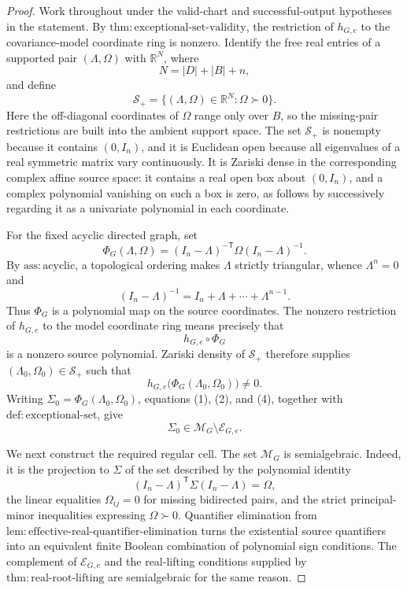 \documentclass{article}
\begin{document}
\begin{proof}
Work throughout under the valid-chart and successful-output hypotheses in the statement.  By \(\mathrm{thm:exceptional\mbox{-}set\mbox{-}validity}\), the restriction of \(h_{G,e}\) to the covariance-model coordinate ring is nonzero.  Identify the free real entries of a supported pair \((\Lambda,\Omega)\) with \(\mathbb R^N\), where
\[
 N=|D|+|B|+n,
\]
and define
\[
 \mathcal S_+
 =\{(\Lambda,\Omega)\in\mathbb R^N:\Omega\succ0\}.
\tag{1}
\]
Here the off-diagonal coordinates of \(\Omega\) range only over \(B\), so the missing-pair restrictions are built into the ambient support space.  The set \(\mathcal S_+\) is nonempty because it contains \((0,I_n)\), and it is Euclidean open because all eigenvalues of a real symmetric matrix vary continuously.  It is Zariski dense in the corresponding complex affine source space: it contains a real open box about \((0,I_n)\), and a complex polynomial vanishing on such a box is zero, as follows by successively regarding it as a univariate polynomial in each coordinate.

For the fixed acyclic directed graph, set
\[
 \Phi_G(\Lambda,\Omega)
 =(I_n-\Lambda)^{-\mathsf T}\Omega(I_n-\Lambda)^{-1}.
\tag{2}
\]
By \(\mathrm{ass:acyclic}\), a topological ordering makes \(\Lambda\) strictly triangular, whence \(\Lambda^n=0\) and
\[
 (I_n-\Lambda)^{-1}=I_n+\Lambda+\cdots+\Lambda^{n-1}.
\tag{3}
\]
Thus \(\Phi_G\) is a polynomial map on the source coordinates.  The nonzero restriction of \(h_{G,e}\) to the model coordinate ring means precisely that
\[
 h_{G,e}\circ\Phi_G
\]
is a nonzero source polynomial.  Zariski density of \(\mathcal S_+\) therefore supplies \((\Lambda_0,\Omega_0)\in\mathcal S_+\) such that
\[
 h_{G,e}\bigl(\Phi_G(\Lambda_0,\Omega_0)\bigr)\ne0.
\tag{4}
\]
Writing \(\Sigma_0=\Phi_G(\Lambda_0,\Omega_0)\), equations (1), (2), and (4), together with \(\mathrm{def:exceptional\mbox{-}set}\), give
\[
 \Sigma_0\in\mathcal M_G\setminus\mathcal E_{G,e}.
\tag{5}
\]

We next construct the required regular cell.  The set \(\mathcal M_G\) is semialgebraic.  Indeed, it is the projection to \(\Sigma\) of the set described by the polynomial identity
\[
 (I_n-\Lambda)^{\mathsf T}\Sigma(I_n-\Lambda)=\Omega,
\tag{6}
\]
the linear equalities \(\Omega_{ij}=0\) for missing bidirected pairs, and the strict principal-minor inequalities expressing \(\Omega\succ0\).  Quantifier elimination from \(\mathrm{lem:effective\mbox{-}real\mbox{-}quantifier\mbox{-}elimination}\) turns the existential source quantifiers into an equivalent finite Boolean combination of polynomial sign conditions.  The complement of \(\mathcal E_{G,e}\) and the real-lifting conditions supplied by \(\mathrm{thm:real\mbox{-}root\mbox{-}lifting}\) are semialgebraic for the same reason.


\end{proof}
\end{document}
